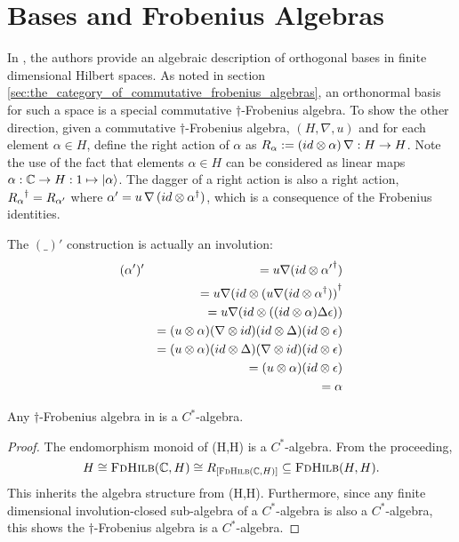 \section{Bases and Frobenius Algebras} %
\label{sec:bases_and_frobenius_algebras}
In \cite{coeckeetal08:ortho}, the authors provide an algebraic description of orthogonal bases in
finite dimensional Hilbert spaces. As noted in section
\ref{sec:the_category_of_commutative_frobenius_algebras}, an orthonormal basis for such a space is
a special commutative $\dagger$-Frobenius algebra. To show the other direction, given a commutative
$\dagger$-Frobenius algebra, $(H,\nabla,u)$ and for each element $\alpha\in H$, define the right
action of $\alpha$ as $R_{\alpha}:=(id\otimes\alpha)\, \nabla:H\to H$. Note the use of the fact that
elements $\alpha\in H$ can be considered as linear maps $\alpha:\mathbb{C} \to H:1\mapsto \left\vert{\alpha}\right\rangle$.
The dagger of a right action is also a right action, ${R_{\alpha}}^{\dagger} = R_{\alpha'}$ where
$\alpha'= u\, \nabla\, (id\otimes {\alpha}^{\dagger})$, which is a consequence of the Frobenius identities.

The $(\_)'$ construction is actually an involution:
\begin{eqnarray*}
  &(\alpha')' &= u \nabla (id \otimes {\alpha'}^{\dagger}) \\
  && = u \nabla (id \otimes {(u \nabla (id \otimes \ensuremath{{\alpha}^{\dagger}}))}^{\dagger}\\
  && = u \nabla (id \otimes ( (id \otimes \alpha) \Delta \epsilon))\\
  && = (u \otimes \alpha) (\nabla \otimes id) (id \otimes \Delta) (id \otimes  \epsilon)\\
  && = (u \otimes \alpha) (id \otimes \Delta) (\nabla \otimes id) (id \otimes  \epsilon)\\
  && = (u \otimes \alpha)  (id \otimes  \epsilon)\\
  && = \alpha
\end{eqnarray*}

\begin{lemma}\label{lemma:cstaralgebra}
  Any $\dagger$-Frobenius algebra in \fdh is a $C^{*}$-algebra.
\end{lemma}
\begin{proof}
  The endomorphism monoid of \fdh(H,H) is a $C^{*}$-algebra. From the proceeding,
  \[
    H \cong \textsc{FdHilb}(\mathbb{C},H) \cong R_{[\textsc{FdHilb}(\mathbb{C},H)]}\subseteq\textsc{FdHilb}(H,H).
  \]
  This inherits the algebra structure from \fdh(H,H). Furthermore, since any finite dimensional
  involution-closed sub-algebra of a $C^{*}$-algebra is also a $C^{*}$-algebra, this shows the
  $\dagger$-Frobenius algebra is a $C^{*}$-algebra.
\end{proof}

